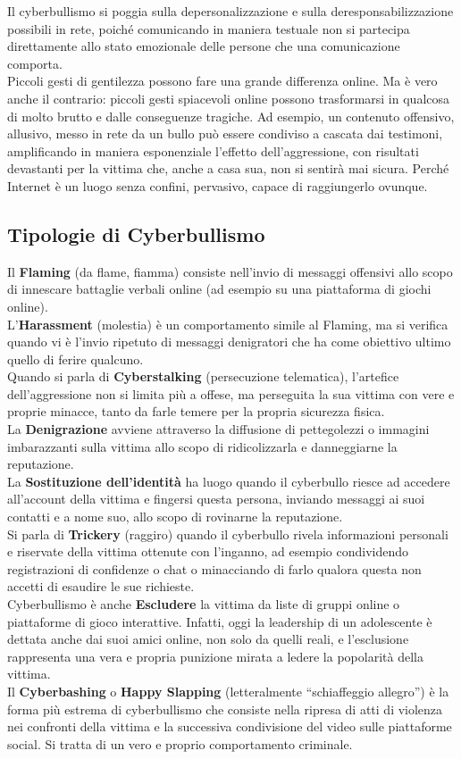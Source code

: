 \documentclass{article}
\begin{document}
Il cyberbullismo si poggia sulla depersonalizzazione e sulla deresponsabilizzazione possibili in rete, poiché comunicando in maniera testuale non si partecipa direttamente allo stato emozionale delle persone che una comunicazione comporta.\\
Piccoli gesti di gentilezza possono fare una grande differenza online. Ma è vero anche il contrario: piccoli gesti spiacevoli online possono trasformarsi in qualcosa di molto brutto e dalle conseguenze tragiche. Ad esempio, un contenuto offensivo, allusivo, messo in rete da un bullo può essere condiviso a cascata dai testimoni, amplificando in maniera esponenziale l’effetto dell’aggressione, con risultati devastanti per la vittima che, anche a casa sua, non si sentirà mai sicura. Perché Internet è un luogo senza confini, pervasivo, capace di raggiungerlo ovunque.
\subsection{Tipologie di Cyberbullismo}
Il \textbf{Flaming} (da flame, fiamma) consiste nell’invio di messaggi offensivi allo scopo di innescare battaglie verbali online (ad esempio su una piattaforma di giochi online).\\
L’\textbf{Harassment} (molestia) è un comportamento simile al Flaming, ma si verifica quando vi è l'invio ripetuto di messaggi denigratori che ha come obiettivo ultimo quello di ferire qualcuno.\\
Quando si parla di \textbf{Cyberstalking} (persecuzione telematica), l’artefice dell’aggressione non si limita più a offese, ma perseguita la sua vittima con vere e proprie minacce, tanto da farle temere per la propria sicurezza fisica.\\
La \textbf{Denigrazione} avviene attraverso la diffusione di pettegolezzi o immagini imbarazzanti sulla vittima allo scopo di ridicolizzarla e danneggiarne la reputazione.\\
La \textbf{Sostituzione dell’identità} ha luogo quando il cyberbullo riesce ad accedere all’account della vittima e fingersi questa persona, inviando messaggi ai suoi contatti e a nome suo, allo scopo di rovinarne la reputazione.\\
Si parla di \textbf{Trickery} (raggiro) quando il cyberbullo rivela informazioni personali e riservate della vittima ottenute con l’inganno, ad esempio condividendo registrazioni di confidenze o chat o minacciando di farlo qualora questa non accetti di esaudire le sue richieste.\\
Cyberbullismo è anche \textbf{Escludere} la vittima da liste di gruppi online o piattaforme di gioco interattive. Infatti, oggi la leadership di un adolescente è dettata anche dai suoi amici online, non solo da quelli reali, e l’esclusione rappresenta una vera e propria punizione mirata a ledere la popolarità della vittima.\\
Il \textbf{Cyberbashing} o \textbf{Happy Slapping} (letteralmente “schiaffeggio allegro”) è la forma più estrema di cyberbullismo che consiste nella ripresa di atti di violenza nei confronti della vittima e la successiva condivisione del video sulle piattaforme social. Si tratta di un vero e proprio comportamento criminale.\\
\end{document}
